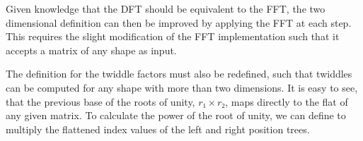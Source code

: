 \begin{AgdaAlign}

Given knowledge that the DFT should be equivalent to the FFT, the two dimensional
definition can then be improved by applying the FFT at each step.
This requires the slight modification of the FFT implementation such that it 
accepts a matrix of any shape  as input.

The definition for the twiddle factors must also be redefined, such that twiddles
can be computed for any shape with more than two dimensions.
It is easy to see, that the previous base of the roots of unity, $r₁\times r₂$,
maps directly to the flat  of any given matrix.
To calculate the power of the root of unity, we can define 
to multiply the flattened index values of the left and right position trees. 
\begin{code}%
%
\>[2]\AgdaSpace{}%
\AgdaSymbol{:}\AgdaSpace{}%
\AgdaSpace{}%
\AgdaSymbol{(}\AgdaSpace{}%
\AgdaSpace{}%
\AgdaSymbol{)}\AgdaSpace{}%
\AgdaSpace{}%
\<%
\\
%
\>[2]\AgdaSpace{}%
\AgdaSymbol{(}\AgdaSpace{}%
\AgdaSpace{}%
\AgdaSymbol{)}\AgdaSpace{}%
\AgdaSymbol{=}\AgdaSpace{}%
\AgdaSpace{}%
\AgdaSymbol{(}\AgdaSpace{}%
\AgdaSpace{}%
\AgdaSpace{}%
\AgdaSymbol{)}\AgdaSpace{}%
\AgdaSpace{}%
\AgdaSpace{}%
\AgdaSymbol{(}\AgdaSpace{}%
\AgdaSpace{}%
\AgdaSpace{}%
\AgdaSymbol{)}\<%
\\
\>[0]\<%
\\
%
\>[2]\AgdaSpace{}%
\AgdaSymbol{:}\AgdaSpace{}%
\AgdaSpace{}%
\AgdaSymbol{(}\AgdaSpace{}%
\AgdaSpace{}%
\AgdaSymbol{)}\AgdaSpace{}%
\<%
\\
%
\>[2]\AgdaSpace{}%
\AgdaSymbol{\{}\AgdaSymbol{\}}\AgdaSpace{}%
\AgdaSymbol{\{}\AgdaSymbol{\}}\AgdaSpace{}%
\AgdaSpace{}%
\AgdaSymbol{=}\AgdaSpace{}%

\end{code}
\end{AgdaAlign}
